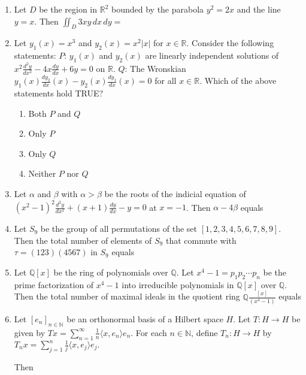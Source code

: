 \documentclass{article}
\newcommand{\brak}[1]{\left( #1 \right)}
\newcommand{\sbrak}[1]{\left[ #1 \right]}
\newcommand{\abs}[1]{\left| #1 \right|}
\newcommand{\gt}{>}
\begin{document}
\begin{enumerate}
\item Let $D$ be the region in $\mathbb{R}^2$ bounded by the parabola $y^2 = 2 x$ and the line $y = x$. Then $\iint_D 3 x y \, dx \, dy =$

\item Let $y_1 \brak{x} = x^3$ and $y_2 \brak{x} = x^2 \abs{x}$ for $x \in \mathbb{R}$.
Consider the following statements:
$P$: $y_1 \brak{x}$ and $y_2 \brak{x}$ are linearly independent solutions of $x^2 \frac{d^2 y}{dx^2}  
 - 4 x \frac{dy}{dx} + 6 y = 0$ on $\mathbb{R}$.
$Q$: The Wronskian $y_1 \brak{x} \frac{dy_2}{dx} \brak{x} - y_2 \brak{x} \frac{dy_1}{dx} \brak{x} = 0$ for all $x \in \mathbb{R}$.  
Which of the above statements hold TRUE?

\begin{enumerate}
    \item Both $P$ and $Q$
    \item Only $P$
    \item Only $Q$
    \item Neither $P$ nor $Q$
\end{enumerate}

\item Let $\alpha$ and $\beta$ with $\alpha \gt \beta$ be the roots of the indicial equation of $\brak{x^2 - 1}^2 \frac{d^2 y}{dx^2} + \brak{x + 1} \frac{dy}{dx} - y = 0$ at $x = -1$. Then $\alpha - 4 \beta$ equals

\item Let $S_9$ be the group of all permutations of the set $\sbrak{1, 2, 3, 4, 5, 6, 7, 8, 9}$. Then the total number of elements of $S_9$ that commute with $\tau = \brak{123} \brak{4567}$ in $S_9$ equals

\item Let $\mathbb{Q} \sbrak{x}$ be the ring of polynomials over $\mathbb{Q}$. Let $x^4 - 1 = p_1 p_2 \cdots p_n$ be the prime factorization of $x^4 - 1$ into irreducible polynomials in $\mathbb{Q} \sbrak{x}$ over $\mathbb{Q}$. Then the total number of maximal ideals in the quotient ring $\mathbb{Q} \frac{\sbrak{x}}{\brak{x^4 - 1}}$ equals

\item Let $\sbrak{e_n}_{n \in \mathbb{N}}$ be an orthonormal basis of a Hilbert space $H$. Let $T: H \to H$ be given by 
$T x = \sum_{n=1}^{\infty} \frac{1}{n} \langle x, e_n \rangle e_n.$
For each $n \in \mathbb{N}$, define $T_n: H \to H$ by 
$T_n x = \sum_{j=1}^{n} \frac{1}{j} \langle x, e_j \rangle e_j.$

Then


\end{enumerate}
\end{document}
